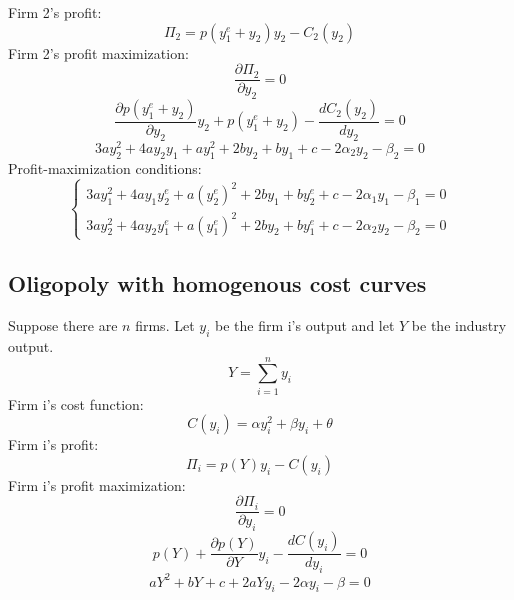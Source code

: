 \documentclass[11pt, a4paper]{article}
\begin{document}
Firm 2's profit:
\begin{equation*} 
	\Pi _{2} = p(y_{1}^e + y_{2})y_{2} - C_{2}(y_{2})
\end{equation*}
Firm 2's profit maximization:
\begin{equation*} 
	\frac{\partial\Pi_{2}}{\partial y_{2}} = 0
\end{equation*}
\begin{equation*} 
	\frac{\partial p(y_{1}^e + y_{2})}{\partial y_{2}}y_{2} + p(y_{1}^e + y_{2}) - \frac{dC_{2}(y_{2})}{dy_{2}} = 0
\end{equation*}
\begin{equation*} 
	3ay_{2}^2 + 4ay_{2}y_{1} + ay_{1}^2 + 2by_{2} + by_{1} + c - 2\alpha _{2}y_{2} - \beta _{2} = 0
\end{equation*}
Profit-maximization conditions:
\begin{equation*}
	\begin{cases}
		3ay_{1}^2 + 4ay_{1}y_{2}^e + a(y_{2}^e)^2 + 2by_{1} + by_{2}^e + c - 2\alpha _{1}y_{1} - \beta _{1} = 0 \\
		3ay_{2}^2 + 4ay_{2}y_{1}^e + a(y_{1}^e)^2 + 2by_{2} + by_{1}^e + c - 2\alpha _{2}y_{2} - \beta _{2} = 0
	\end{cases}
\end{equation*}

\subsection{Oligopoly with homogenous cost curves}

Suppose there are $n$ firms. Let $y_{i}$ be the firm i's output and let $Y$ be the industry output.
\begin{equation*}
	Y = \sum_{i = 1}^{n}y_{i}
\end{equation*}
Firm i's cost function:
\begin{equation*}
	C(y_{i}) = \alpha y_{i}^2 + \beta y_{i} + \theta
\end{equation*}
Firm i's profit:
\begin{equation*}
	\Pi _{i} = p(Y)y_{i} - C(y_{i})
\end{equation*}
Firm i's profit maximization:
\begin{equation*}
	\frac{\partial \Pi_{i}}{\partial y_{i}} = 0
\end{equation*}
\begin{equation*}
	p(Y) + \frac{\partial p(Y)}{\partial Y}y_{i} - \frac{dC(y_{i})}{dy_{i}} = 0
\end{equation*}
\begin{equation*}
	aY^2 + bY + c + 2aYy_{i} - 2\alpha y_{i} - \beta = 0
\end{equation*}
\end{document}
